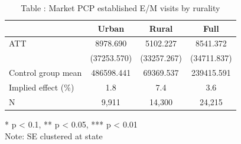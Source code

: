 \begin{table}[t]
\caption*{
{\fontsize{20}{25}\selectfont  Table : Market PCP established E/M visits by rurality\fontsize{12}{15}\selectfont }
} 
\fontsize{12.0pt}{14.0pt}\selectfont
\begin{tabular*}{\linewidth}{@{\extracolsep{\fill}}lccc}
\toprule
  & Urban & Rural & Full \\ 
\midrule\addlinespace[2.5pt]
ATT & 8978.690 & 5102.227 & 8541.372 \\ 
 & (37253.570) & (33257.267) & (34711.837) \\ 
Control group mean & 486598.441 & 69369.537 & 239415.591 \\ 
Implied effect (\%) & 1.8 & 7.4 & 3.6 \\ 
N & 9,911 & 14,300 & 24,215 \\ 
\bottomrule
\end{tabular*}
\begin{minipage}{\linewidth}
* p < 0.1, ** p < 0.05, *** p < 0.01\\
Note: SE clustered at state\\
\end{minipage}
\end{table}

